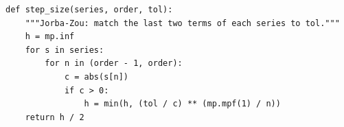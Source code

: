\begin{verbatim}
def step_size(series, order, tol):
    """Jorba-Zou: match the last two terms of each series to tol."""
    h = mp.inf
    for s in series:
        for n in (order - 1, order):
            c = abs(s[n])
            if c > 0:
                h = min(h, (tol / c) ** (mp.mpf(1) / n))
    return h / 2
\end{verbatim}
